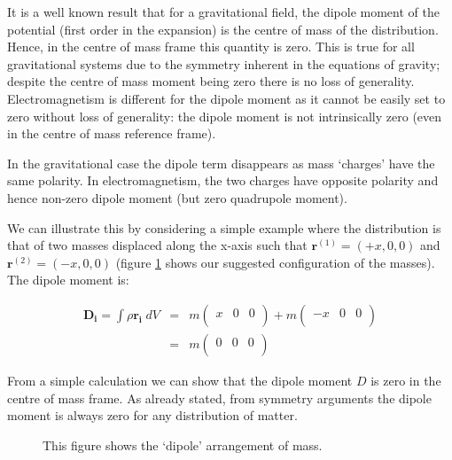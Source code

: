 It is a well known result that for a gravitational field, the dipole moment of the potential (first order in the expansion) is the centre of mass 
of the distribution. Hence, in the centre of mass frame this quantity is zero. This is true for all gravitational systems due to the symmetry inherent in the equations of gravity; despite the centre of mass moment being zero there is no loss of generality. Electromagnetism is different for the dipole moment as it cannot be easily set to zero without loss of generality: the dipole moment is not intrinsically zero (even in the centre of mass reference frame).

In the gravitational case the dipole term disappears as mass `charges' have the same polarity. In electromagnetism, the two charges have opposite polarity and hence non-zero dipole moment (but zero quadrupole moment).

We can illustrate this by considering a simple example where the distribution is that of two masses displaced along the x-axis such that $\mathbf{r}^{(1)} = (+x,0,0)$ and $\mathbf{r}^{(2)} = (-x,0,0)$ (figure \ref{fig.dipole} shows our suggested configuration of the masses). The dipole moment is:

\begin{eqnarray}
\mathbf{D_i} = \int \rho \mathbf{r_i} \;dV &=& m\left(\begin{array}{ccc}
x & 0 & 0 \\
\end{array}\right)
+ m\left(\begin{array}{ccc}
-x & 0 & 0 \\
\end{array}\right) \\
&=& m \left(\begin{array}{ccc}
0 & 0 & 0 \\
\end{array}\right)
\end{eqnarray}

From a simple calculation we can show that the dipole moment $D$ is zero in the centre of mass frame. As already stated, from symmetry arguments the dipole moment is always zero for any distribution of matter.

\begin{figure}[htb]
   \begin{center}
     \leavevmode
                \epsfxsize=80mm

   \end{center}
\caption{This figure shows the `dipole' arrangement of mass.}
\label{fig.dipole}
\end{figure} 

